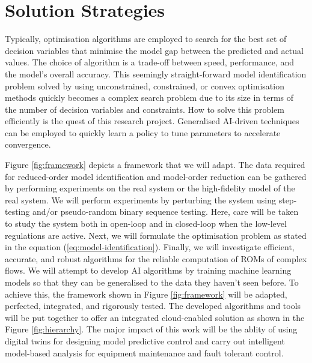 \documentclass[oneside,11pt,a4paper]{article}
\begin{document}
\section{Solution Strategies}



Typically, optimisation algorithms are employed to search for the best set of decision variables that minimise the model gap between the predicted and actual values. The choice of algorithm is a trade-off between speed, performance, and the model's overall accuracy. This seemingly straight-forward model identification problem solved by using unconstrained, constrained, or convex optimisation methods quickly becomes a complex search problem due to its size in terms of the number of decision variables and constraints. How to solve this problem efficiently is the quest of this research project. Generalised AI-driven techniques can be employed to quickly learn a policy to tune parameters to accelerate convergence.

Figure \ref{fig:framework} depicts a framework that we will adapt. The data required for reduced-order model identification and model-order reduction can be gathered by performing experiments on the real system or the high-fidelity model of the real system. We will perform experiments by perturbing the system using step-testing and/or pseudo-random binary sequence testing. Here, care will be taken to study the system both in open-loop and in closed-loop when the low-level regulations are active. Next, we will formulate the optimisation problem as stated in the equation (\ref{eq:model-identification}). Finally, we will investigate efficient, accurate, and robust algorithms for the reliable computation of ROMs of complex flows. We will attempt to develop AI algorithms by training machine learning models so that they can be generalised to the data they haven’t seen before. To achieve this, the framework shown in Figure \ref{fig:framework} will be adapted, perfected, integrated, and rigorously tested. The developed algorithms and tools will be put together to offer an integrated cloud-enabled solution as shown in the Figure \ref{fig:hierarchy}. The major impact of this work will be the ablity of using digital twins for designing model predictive control and carry out intelligent model-based analysis for equipment maintenance and fault tolerant control.


\end{document}
